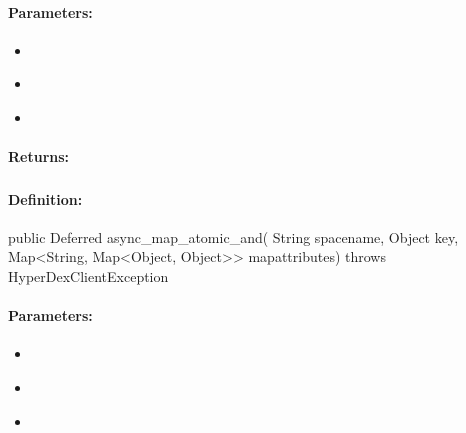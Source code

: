 \paragraph{Parameters:}
\begin{itemize}[noitemsep]
\item {}\\

\item {}\\

\item {}\\

\end{itemize}

\paragraph{Returns:}


\pagebreak
\subsubsection{}
\label{api:java:async_map_atomic_and}


\paragraph{Definition:}
\begin{javacode}
public Deferred async_map_atomic_and(
        String spacename,
        Object key,
        Map<String, Map<Object, Object>> mapattributes) throws HyperDexClientException
\end{javacode}

\paragraph{Parameters:}
\begin{itemize}[noitemsep]
\item {}\\

\item {}\\

\item {}\\

\end{itemize}

